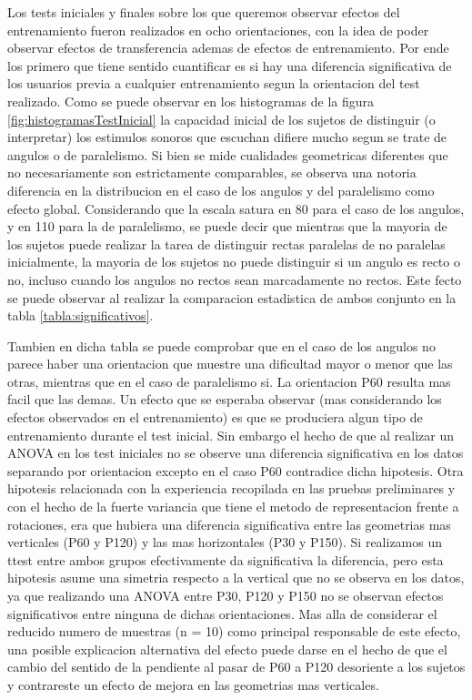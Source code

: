 \documentclass{article}
\begin{document}
Los tests iniciales y finales sobre los que queremos observar efectos del entrenamiento fueron realizados en ocho orientaciones, con la idea de poder observar efectos de transferencia ademas de efectos de entrenamiento. Por ende los primero que tiene sentido cuantificar es si hay una diferencia significativa de los usuarios previa a cualquier entrenamiento segun la orientacion del test realizado. Como se puede observar en los histogramas de la figura \ref{fig:histogramasTestInicial} la capacidad inicial de los sujetos de distinguir (o interpretar) los estimulos sonoros que escuchan difiere mucho segun se trate de angulos o de paralelismo. Si bien se mide cualidades geometricas diferentes que no necesariamente son estrictamente comparables, se observa una notoria diferencia en la distribucion en el caso de los angulos y del paralelismo como efecto global. Considerando que la escala satura en 80 para el caso de los angulos, y en 110 para la de paralelismo, se puede decir que mientras que la mayoria de los sujetos puede realizar la tarea de distinguir rectas paralelas de no paralelas inicialmente, la mayoria de los sujetos no puede distinguir si un angulo es recto o no, incluso cuando los angulos no rectos sean marcadamente no rectos. Este fecto se puede observar al realizar la comparacion estadistica de ambos conjunto en la tabla \ref{tabla:significativos}.

Tambien en dicha tabla se puede comprobar que en el caso de los angulos no parece haber una orientacion que muestre una dificultad mayor o menor que las otras, mientras que en el caso de paralelismo si. La orientacion P60 resulta mas facil que las demas. Un efecto que se esperaba observar (mas considerando los efectos observados en el entrenamiento) es que se produciera algun tipo de entrenamiento durante el test inicial. Sin embargo el hecho de que al realizar un ANOVA en los test iniciales no se observe una diferencia significativa en los datos separando por orientacion excepto en el caso P60 contradice dicha hipotesis. Otra hipotesis relacionada con la experiencia recopilada en las pruebas preliminares y con el hecho de la fuerte variancia que tiene el metodo de representacion frente a rotaciones, era que hubiera una diferencia significativa entre las geometrias mas verticales (P60 y P120) y las mas horizontales (P30 y P150). Si realizamos un ttest entre ambos grupos efectivamente da significativa la diferencia, pero esta hipotesis asume una simetria respecto a la vertical que no se observa en los datos, ya que realizando una ANOVA entre P30, P120 y P150 no se observan efectos significativos entre ninguna de dichas orientaciones. Mas alla de considerar el reducido numero de muestras (n = 10) como principal responsable de este efecto, una posible explicacion alternativa del efecto puede darse en el hecho de que el cambio del sentido de la pendiente al pasar de P60 a P120 desoriente a los sujetos y contrareste un efecto de mejora en las geometrias mas verticales. 
\end{document}
